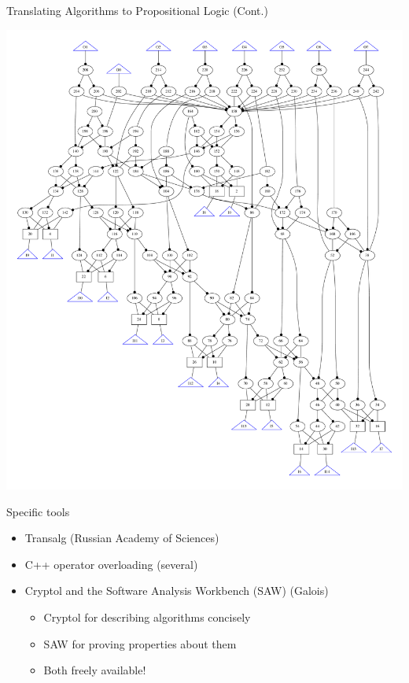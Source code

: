 \documentclass[ignorenonframetext,]{beamer}
\providecommand{\tightlist}{%
  \setlength{\itemsep}{0pt}\setlength{\parskip}{0pt}}
\begin{document}
\begin{frame}{Translating Algorithms to Propositional Logic (Cont.)}

\begin{center}
\includegraphics[height=0.8\textheight]{images/addm.pdf}
\end{center}

\end{frame}

\begin{frame}{Specific tools}

\begin{itemize}
\tightlist
\item
  Transalg (Russian Academy of Sciences) \cite{transalg}
\item
  C++ operator overloading (several) \cite{jovanovic2005logical}
\item
  Cryptol and the Software Analysis Workbench (SAW) (Galois)

  \begin{itemize}
  \tightlist
  \item
    Cryptol for describing algorithms concisely
  \item
    SAW for proving properties about them
  \item
    Both freely available!
  \end{itemize}
\end{itemize}

\end{frame}
\end{document}
